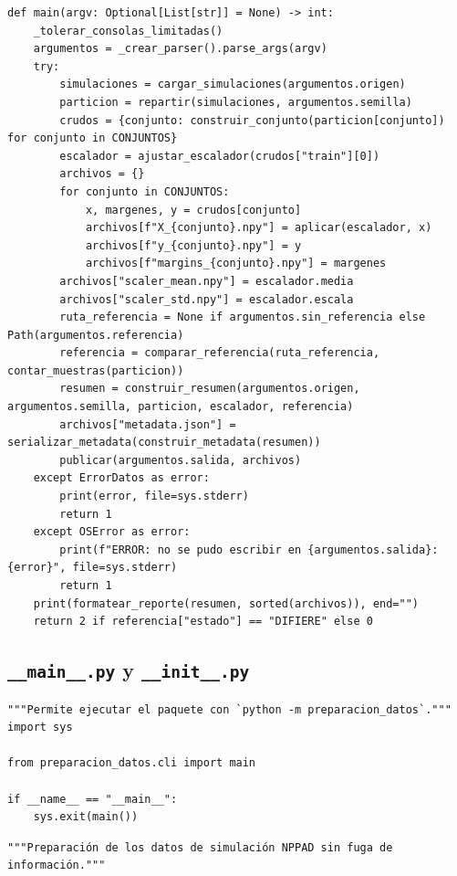 \documentclass[12pt,a4paper]{article}
\begin{document}
\begin{lstlisting}
def main(argv: Optional[List[str]] = None) -> int:
    _tolerar_consolas_limitadas()
    argumentos = _crear_parser().parse_args(argv)
    try:
        simulaciones = cargar_simulaciones(argumentos.origen)
        particion = repartir(simulaciones, argumentos.semilla)
        crudos = {conjunto: construir_conjunto(particion[conjunto]) for conjunto in CONJUNTOS}
        escalador = ajustar_escalador(crudos["train"][0])
        archivos = {}
        for conjunto in CONJUNTOS:
            x, margenes, y = crudos[conjunto]
            archivos[f"X_{conjunto}.npy"] = aplicar(escalador, x)
            archivos[f"y_{conjunto}.npy"] = y
            archivos[f"margins_{conjunto}.npy"] = margenes
        archivos["scaler_mean.npy"] = escalador.media
        archivos["scaler_std.npy"] = escalador.escala
        ruta_referencia = None if argumentos.sin_referencia else Path(argumentos.referencia)
        referencia = comparar_referencia(ruta_referencia, contar_muestras(particion))
        resumen = construir_resumen(argumentos.origen, argumentos.semilla, particion, escalador, referencia)
        archivos["metadata.json"] = serializar_metadata(construir_metadata(resumen))
        publicar(argumentos.salida, archivos)
    except ErrorDatos as error:
        print(error, file=sys.stderr)
        return 1
    except OSError as error:
        print(f"ERROR: no se pudo escribir en {argumentos.salida}: {error}", file=sys.stderr)
        return 1
    print(formatear_reporte(resumen, sorted(archivos)), end="")
    return 2 if referencia["estado"] == "DIFIERE" else 0
\end{lstlisting}
\subsection*{\texttt{\_\_main\_\_.py} y \texttt{\_\_init\_\_.py}}
\begin{lstlisting}
"""Permite ejecutar el paquete con `python -m preparacion_datos`."""
import sys

from preparacion_datos.cli import main

if __name__ == "__main__":
    sys.exit(main())
\end{lstlisting}
\begin{lstlisting}
"""Preparación de los datos de simulación NPPAD sin fuga de información."""
\end{lstlisting}
\end{document}
